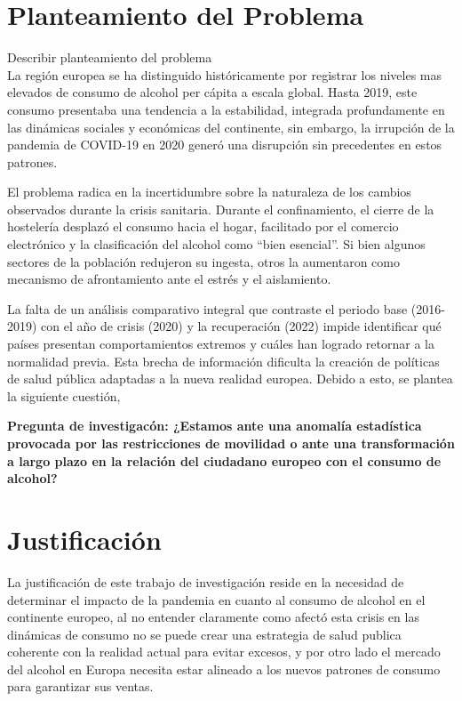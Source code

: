 \documentclass[
]{article}
\begin{document}
\section{Planteamiento del Problema}

Describir planteamiento del problema\\

La región europea se ha distinguido históricamente por registrar los
niveles mas elevados de consumo de alcohol per cápita a escala global.
Hasta 2019, este consumo presentaba una tendencia a la estabilidad,
integrada profundamente en las dinámicas sociales y económicas del
continente, sin embargo, la irrupción de la pandemia de COVID-19 en 2020
generó una disrupción sin precedentes en estos patrones.

El problema radica en la incertidumbre sobre la naturaleza de los
cambios observados durante la crisis sanitaria. Durante el
confinamiento, el cierre de la hostelería desplazó el consumo hacia el
hogar, facilitado por el comercio electrónico y la clasificación del
alcohol como ``bien esencial''. Si bien algunos sectores de la población
redujeron su ingesta, otros la aumentaron como mecanismo de
afrontamiento ante el estrés y el aislamiento.

La falta de un análisis comparativo integral que contraste el periodo
base (2016-2019) con el año de crisis (2020) y la recuperación (2022)
impide identificar qué países presentan comportamientos extremos y
cuáles han logrado retornar a la normalidad previa. Esta brecha de
información dificulta la creación de políticas de salud pública
adaptadas a la nueva realidad europea. Debido a esto, se plantea la
siguiente cuestión,

\textbf{Pregunta de investigacón: ¿Estamos ante una anomalía estadística provocada por las restricciones de movilidad o ante una transformación a largo plazo en la relación del ciudadano europeo con el consumo de alcohol?}

\section{Justificación}

La justificación de este trabajo de investigación reside en la necesidad
de determinar el impacto de la pandemia en cuanto al consumo de alcohol
en el continente europeo, al no entender claramente como afectó esta
crisis en las dinámicas de consumo no se puede crear una estrategia de
salud publica coherente con la realidad actual para evitar excesos, y
por otro lado el mercado del alcohol en Europa necesita estar alineado a
los nuevos patrones de consumo para garantizar sus ventas.
\end{document}

